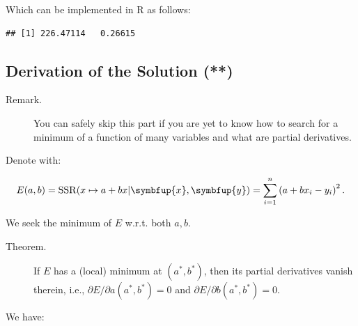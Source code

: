 \documentclass[10pt,b5paper,krantz1]{krantz}
\newenvironment{Shaded}{\begin{snugshade}}{\end{snugshade}}
\newcommand{\CommentTok}[1]{\textcolor[rgb]{0.37,0.37,0.37}{\textit{#1}}}
\newcommand{\DecValTok}[1]{\textcolor[rgb]{0.06,0.06,0.06}{#1}}
\newcommand{\KeywordTok}[1]{\textcolor[rgb]{0.27,0.27,0.27}{\textbf{#1}}}
\newcommand{\NormalTok}[1]{#1}
\newcommand{\OperatorTok}[1]{\textcolor[rgb]{0.43,0.43,0.43}{\textbf{#1}}}
\newcommand{\StringTok}[1]{\textcolor[rgb]{0.5,0.5,0.5}{#1}}
\renewcommand{\mathbf}[1]{\symbfup{#1}}
\begin{document}
Which can be implemented in R as follows:

\begin{Shaded}
\end{Shaded}

\begin{verbatim}
## [1] 226.47114   0.26615
\end{verbatim}

\hypertarget{derivation-of-the-solution}{%
\subsection{Derivation of the Solution (**)}\label{derivation-of-the-solution}}

\begin{description}
\item[Remark.]
You can safely skip this part if you are yet to know
how to search for a minimum of a function of many variables
and what are partial derivatives.
\end{description}

Denote with:

\[
E(a,b)=\mathrm{SSR}(x\mapsto a+bx|\mathbf{x},\mathbf{y})
=\sum_{i=1}^n \left( a+bx_i - y_i \right) ^2.
\]

We seek the minimum of \(E\) w.r.t. both \(a,b\).

\begin{description}
\item[Theorem.]
If \(E\) has a (local) minimum at \((a^*,b^*)\),
then its partial derivatives vanish therein,
i.e., \(\partial E/\partial a(a^*, b^*) = 0\) and \(\partial E/\partial b(a^*, b^*)=0\).
\end{description}

We have:
\end{document}
